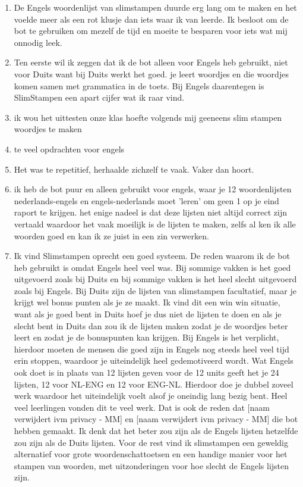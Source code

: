 \documentclass[12pt, a4paper]{article}
\begin{document}
\begin{enumerate}
    \item De Engels woordenlijst van slimstampen duurde erg lang om te maken en het voelde meer als een rot klusje dan iets waar ik van leerde. Ik besloot om de bot te gebruiken om mezelf de tijd en moeite te besparen voor iets wat mij onnodig leek.
    \item Ten eerste wil ik zeggen dat ik de bot alleen voor Engels heb gebruikt, niet voor Duits want bij Duits werkt het goed. je leert woordjes en die woordjes komen samen met grammatica in de toets. Bij Engels daarentegen is SlimStampen een apart cijfer wat ik raar vind.
    \item ik wou het uittesten onze klas hoefte volgends mij geeneens slim stampen woordjes te maken
    \item te veel opdrachten voor engels
    \item Het was te repetitief, herhaalde zichzelf te vaak. Vaker dan hoort.
    \item ik heb de bot puur en alleen gebruikt voor engels, waar je 12 woordenlijsten nederlands-engels en engels-nederlands moet 'leren' om geen 1 op je eind raport te krijgen. het enige nadeel is dat deze lijsten niet altijd correct zijn vertaald waardoor het vaak moeilijk is de lijsten te maken, zelfs al ken ik alle woorden goed en kan ik ze juist in een zin verwerken.
    \item Ik vind Slimstampen oprecht een goed systeem. De reden waarom ik de bot heb gebruikt is omdat Engels heel veel was. Bij sommige vakken is het goed uitgevoerd zoals bij Duits en bij sommige vakken is het heel slecht uitgevoerd zoals bij Engels. Bij Duits zijn de lijsten van slimstampen facultatief, maar je krijgt wel bonus punten als je ze maakt. Ik vind dit een win win situatie, want als je goed bent in Duits hoef je dus niet de lijsten te doen en als je slecht bent in Duits dan zou ik de lijsten maken zodat je de woordjes beter leert en zodat je de bonuspunten kan krijgen. Bij Engels is het verplicht, hierdoor moeten de mensen die goed zijn in Engels nog steeds heel veel tijd erin stoppen, waardoor je uiteindelijk heel gedemotiveerd wordt. Wat Engels ook doet is in plaats van 12 lijsten geven voor de 12 units geeft het je 24 lijsten, 12 voor NL-ENG en 12 voor ENG-NL. Hierdoor doe je dubbel zoveel werk waardoor het uiteindelijk voelt alsof je oneindig lang bezig bent. Heel veel leerlingen vonden dit te veel werk. Dat is ook de reden dat [naam verwijdert ivm privacy - MM] en [naam verwijdert ivm privacy - MM] die bot hebben gemaakt. Ik denk dat het beter zou zijn als de Engels lijsten hetzelfde zou zijn als de Duits lijsten. Voor de rest vind ik slimstampen een geweldig alternatief voor grote woordenschattoetsen en een handige manier voor het stampen van woorden, met uitzonderingen voor hoe slecht de Engels lijsten zijn.

\end{enumerate}
\end{document}
